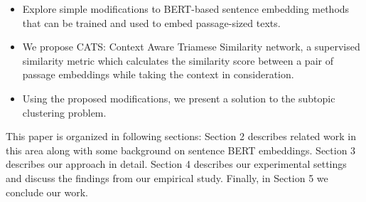 \begin{itemize}
    \item Explore simple modifications to BERT-based sentence embedding methods that can be trained and used to embed passage-sized texts.
    \item We propose CATS: Context Aware Triamese Similarity network, a supervised similarity metric which calculates the similarity score between a pair of passage embeddings while taking the context in consideration.
    \item Using the proposed modifications, we present a solution to the subtopic clustering problem.
\end{itemize}

This paper is organized in following sections: Section 2  describes related work in this area along with some background on sentence BERT embeddings. Section 3 describes our approach in detail. Section 4 describes our experimental settings and discuss the findings from our empirical study. Finally, in Section 5 we conclude our work.

